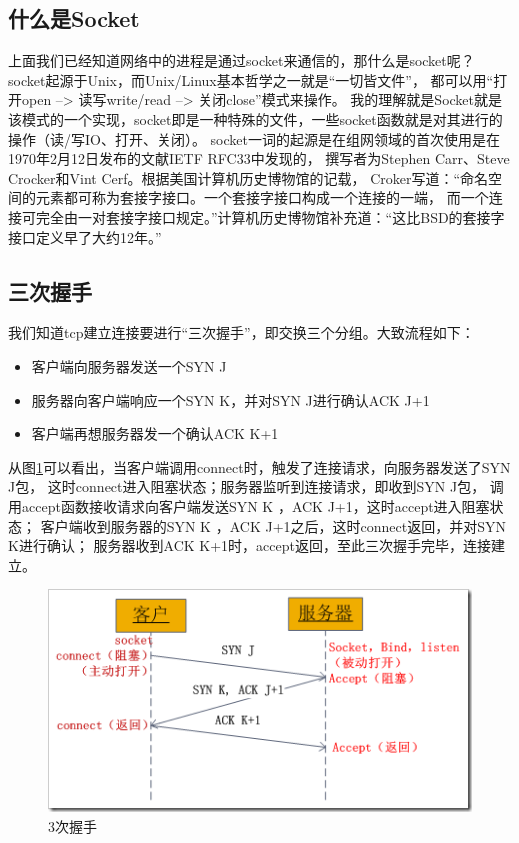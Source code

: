\documentclass{book}
\begin{document}
\subsection{什么是Socket}

上面我们已经知道网络中的进程是通过socket来通信的，那什么是socket呢？
socket起源于Unix，而Unix/Linux基本哲学之一就是“一切皆文件”，
都可以用“打开open –> 读写write/read –> 关闭close”模式来操作。
我的理解就是Socket就是该模式的一个实现，socket即是一种特殊的文件，一些socket函数就是对其进行的操作（读/写IO、打开、关闭）。
socket一词的起源是在组网领域的首次使用是在1970年2月12日发布的文献IETF RFC33中发现的，
撰写者为Stephen Carr、Steve Crocker和Vint Cerf。根据美国计算机历史博物馆的记载，
Croker写道：“命名空间的元素都可称为套接字接口。一个套接字接口构成一个连接的一端，
而一个连接可完全由一对套接字接口规定。”计算机历史博物馆补充道：“这比BSD的套接字接口定义早了大约12年。”

\subsection{三次握手}

我们知道tcp建立连接要进行“三次握手”，即交换三个分组。大致流程如下：

\begin{itemize}
	\item{客户端向服务器发送一个SYN J}
	\item{服务器向客户端响应一个SYN K，并对SYN J进行确认ACK J+1}
	\item{客户端再想服务器发一个确认ACK K+1}
\end{itemize}

从图\ref{fig:ThreeHandShake}可以看出，当客户端调用connect时，触发了连接请求，向服务器发送了SYN J包，
这时connect进入阻塞状态；服务器监听到连接请求，即收到SYN J包，
调用accept函数接收请求向客户端发送SYN K ，ACK J+1，这时accept进入阻塞状态；
客户端收到服务器的SYN K ，ACK J+1之后，这时connect返回，并对SYN K进行确认；
服务器收到ACK K+1时，accept返回，至此三次握手完毕，连接建立。

\begin{figure}[htbp]
	\centering
	\includegraphics[scale=0.7]{ThreeHandShake.png}
	\caption{3次握手}
	\label{fig:ThreeHandShake}
\end{figure}
\end{document}

